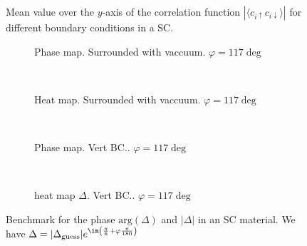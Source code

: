\documentclass[../main.tex]{subfiles}
\begin{document}
\begin{figure}[H]
    \centering
    
    \caption{Mean value over the $y$-axis of the correlation function $|\langle c_{i\uparrow} c_{i\downarrow}\rangle|$ for different boundary conditions in a SC.}
\end{figure}
\begin{figure}[H]
\begin{subfigure}{0.4\textwidth}
    \centering
    \hspace{-4cm} %
    
    \caption{Phase map. Surrounded with vaccuum. $\varphi = 117\deg$}
    \label{fig:first}
\end{subfigure}    \\
\begin{subfigure}{0.4\textwidth}
    \centering
    \hspace{-4cm} %
    
    \caption{Heat map. Surrounded with vaccuum. $\varphi = 117\deg$}
    \label{fig:first}
\end{subfigure}    \\
\begin{subfigure}{0.4\textwidth}
    \centering
    \hspace{-4cm} %
    
    \caption{Phase map. Vert BC.. $\varphi = 117\deg$}
    \label{fig:first}
\end{subfigure}    \\
\begin{subfigure}{0.4\textwidth}
    \centering
    \hspace{-4cm} %
    
    \caption{heat map $\Delta$. Vert BC.. $\varphi = 117\deg$}
    \label{fig:first}
\end{subfigure}    
\caption{Benchmark for the phase $\text{arg}(\Delta)$ and $|\Delta|$ in an SC material. We have $\Delta = |\Delta_{\text{guess}}|e^{\im \left(\frac{\pi}{6} + \varphi\frac{\pi}{180}\right)}$}

\end{figure}
\end{document}
